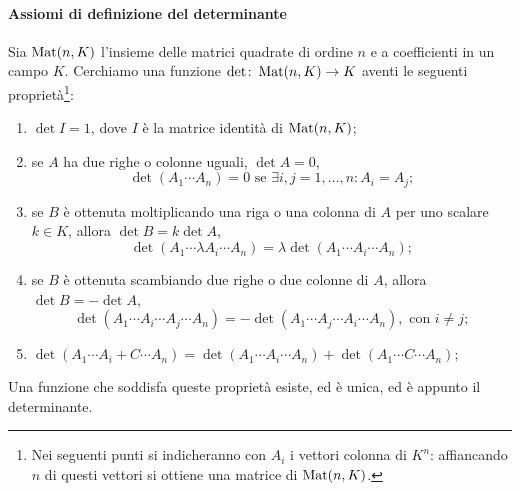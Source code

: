 \paragraph{Assiomi di definizione del determinante}
Sia $\operatorname{Mat}(n,K)$ l'insieme delle matrici quadrate di ordine $n$ e a coefficienti in un campo $K$.
Cerchiamo una funzione $\det\colon\operatorname{Mat}(n,K)\to K$ aventi le seguenti proprietà\footnote{Nei seguenti punti si indicheranno con $A_i$ i vettori colonna di $K^n$: affiancando $n$ di questi vettori si ottiene una matrice di $\operatorname{Mat}(n,K)$.}:
\begin{enumerate}[label=(\roman*)]
	\item $\det I=1$, dove $I$ è la matrice identità di $\operatorname{Mat}(n,K)$;
	\item se $A$ ha due righe o colonne uguali, $\det A=0$,
		\begin{equation*}
		\det(A_1\cdots A_n)=0\text{ se }\exists i,j=1,\dots,n\colon A_i=A_j;
		\end{equation*}
	\item se $B$ è ottenuta moltiplicando una riga o una colonna di $A$ per uno scalare $k\in K$, allora $\det B=k\det A$,
		\begin{equation*}
		\det(A_1\cdots\lambda A_i\cdots A_n)=\lambda\det(A_1\cdots A_i\cdots A_n);
		\end{equation*}
	\item se $B$ è ottenuta scambiando due righe o due colonne di $A$, allora $\det B=-\det A$,
		\begin{equation*}
		\det(A_1\cdots A_i\cdots A_j\cdots A_n)=-\det(A_1\cdots A_j\cdots A_i\cdots A_n),\text{ con }i\neq j;
		\end{equation*}
	\item $\det(A_1\cdots A_i+C\cdots A_n)=\det(A_1\cdots A_i\cdots A_n)+\det(A_1\cdots C\cdots A_n);$ 
\end{enumerate}
Una funzione che soddisfa queste proprietà esiste, ed è unica, ed è appunto il determinante.

